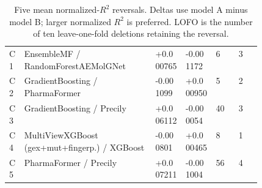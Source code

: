 \begin{table}[htbp]
\centering\small{}
\caption{Five mean normalized-$R^2$ reversals. Deltas use model A minus model B; larger normalized $R^2$ is preferred. LOFO is the number of ten leave-one-fold deletions retaining the reversal.}
\begin{tabularx}{\linewidth}{@{}L{0.06\linewidth}XN{0.12\linewidth}N{0.12\linewidth}N{0.09\linewidth}N{0.09\linewidth}@{}}
\toprule
{} &  &  &  &  & \\\midrule
C1 & EnsembleMF / RandomForestAEMolGNet & +0.000765 & -0.001172 & 6 & 3\\
C2 & GradientBoosting / PharmaFormer & -0.001099 & +0.000950 & 5 & 2\\
C3 & GradientBoosting / Precily & +0.006112 & -0.000054 & 40 & 3\\
C4 & MultiViewXGBoost (gex+mut+fingerp.) / XGBoost & -0.000801 & +0.000465 & 8 & 1\\
C5 & PharmaFormer / Precily & +0.007211 & -0.001004 & 56 & 4\\
\bottomrule
\end{tabularx}
\end{table}
